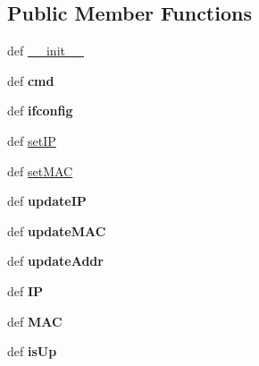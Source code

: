 \subsection*{Public Member Functions}
\begin{DoxyCompactItemize}
\item 
def \hyperlink{classmininet_1_1link_1_1Intf_ac3708a345a8200074187a926ab875926}{\-\_\-\-\_\-init\-\_\-\-\_\-}
\item 
\hypertarget{classmininet_1_1link_1_1Intf_aa5178173be205e3ab5e53f950c42f937}{def {\bfseries cmd}}\label{classmininet_1_1link_1_1Intf_aa5178173be205e3ab5e53f950c42f937}

\item 
\hypertarget{classmininet_1_1link_1_1Intf_ac55a9b13b8619e83dfb7709a79183257}{def {\bfseries ifconfig}}\label{classmininet_1_1link_1_1Intf_ac55a9b13b8619e83dfb7709a79183257}

\item 
def \hyperlink{classmininet_1_1link_1_1Intf_ac9e461d9946cf8b2f12657da56f94001}{set\-I\-P}
\item 
def \hyperlink{classmininet_1_1link_1_1Intf_a7676b089cc7d957a0f46d8536fc463ff}{set\-M\-A\-C}
\item 
\hypertarget{classmininet_1_1link_1_1Intf_a915bcdd813ad97ed1318adc0a677cf7d}{def {\bfseries update\-I\-P}}\label{classmininet_1_1link_1_1Intf_a915bcdd813ad97ed1318adc0a677cf7d}

\item 
\hypertarget{classmininet_1_1link_1_1Intf_a31c76efcfc79c0a68abab3be7be2cfc2}{def {\bfseries update\-M\-A\-C}}\label{classmininet_1_1link_1_1Intf_a31c76efcfc79c0a68abab3be7be2cfc2}

\item 
\hypertarget{classmininet_1_1link_1_1Intf_aec843acd406ca8d8a61587cb2ad4e5f3}{def {\bfseries update\-Addr}}\label{classmininet_1_1link_1_1Intf_aec843acd406ca8d8a61587cb2ad4e5f3}

\item 
\hypertarget{classmininet_1_1link_1_1Intf_a151d6511ff83dbc2496d468a265da37e}{def {\bfseries I\-P}}\label{classmininet_1_1link_1_1Intf_a151d6511ff83dbc2496d468a265da37e}

\item 
\hypertarget{classmininet_1_1link_1_1Intf_a2201144993f114c7ba335cfeb0322ecc}{def {\bfseries M\-A\-C}}\label{classmininet_1_1link_1_1Intf_a2201144993f114c7ba335cfeb0322ecc}

\item 
\hypertarget{classmininet_1_1link_1_1Intf_a22278c7e6f880a0cf8a4b3bb40061417}{def {\bfseries is\-Up}}\label{classmininet_1_1link_1_1Intf_a22278c7e6f880a0cf8a4b3bb40061417}


\end{DoxyCompactItemize}
